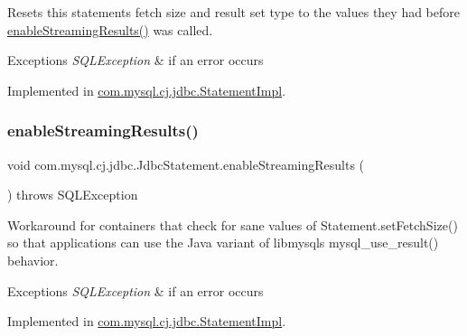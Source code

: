 Resets this statements fetch size and result set type to the values they had before \mbox{\hyperlink{interfacecom_1_1mysql_1_1cj_1_1jdbc_1_1_jdbc_statement_a35049f45e6278dc1b824812acbe75556}{enable\+Streaming\+Results()}} was called.


\begin{DoxyExceptions}{Exceptions}
{\em S\+Q\+L\+Exception} & if an error occurs \\
\hline
\end{DoxyExceptions}


Implemented in \mbox{\hyperlink{classcom_1_1mysql_1_1cj_1_1jdbc_1_1_statement_impl_a9e5713d601e7e410e0edb1647b6f9160}{com.\+mysql.\+cj.\+jdbc.\+Statement\+Impl}}.

\mbox{\label{interfacecom_1_1mysql_1_1cj_1_1jdbc_1_1_jdbc_statement_a35049f45e6278dc1b824812acbe75556}} 
\subsubsection{\texorpdfstring{enable\+Streaming\+Results()}{enableStreamingResults()}}
{\footnotesize\ttfamily void com.\+mysql.\+cj.\+jdbc.\+Jdbc\+Statement.\+enable\+Streaming\+Results (\begin{DoxyParamCaption}{ }\end{DoxyParamCaption}) throws S\+Q\+L\+Exception}

Workaround for containers that \textquotesingle{}check\textquotesingle{} for sane values of Statement.\+set\+Fetch\+Size() so that applications can use the Java variant of libmysql\textquotesingle{}s mysql\+\_\+use\+\_\+result() behavior.


\begin{DoxyExceptions}{Exceptions}
{\em S\+Q\+L\+Exception} & if an error occurs \\
\hline
\end{DoxyExceptions}


Implemented in \mbox{\hyperlink{classcom_1_1mysql_1_1cj_1_1jdbc_1_1_statement_impl_a973ff5045e258a5c3e156887c116c976}{com.\+mysql.\+cj.\+jdbc.\+Statement\+Impl}}.

\mbox{\label{interfacecom_1_1mysql_1_1cj_1_1jdbc_1_1_jdbc_statement_acaa2fa9b43fdb8d5020efed654034d53}} 
